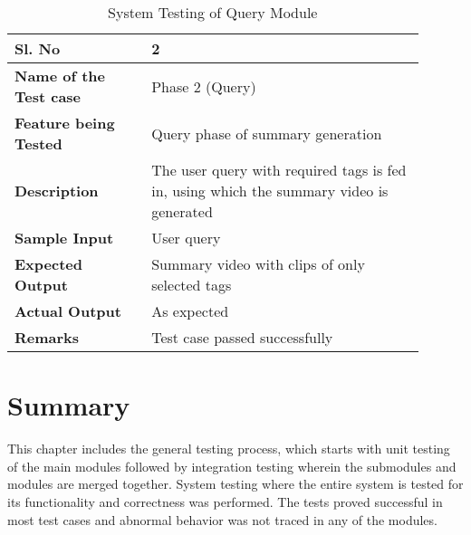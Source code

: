     \FloatBarrier
    \begin{table}[H]
        \begin{tabular}{|p{0.3\linewidth}|p{0.6\linewidth}|}
            \hline
            \textbf{Sl. No }              &\textbf{ 2}\\
            \hline
            \textbf{Name of the Test case}  & Phase 2 (Query) \\
            \hline
            \textbf{Feature being Tested}  & Query phase of summary generation \\
            \hline
            \textbf{Description}           & The user query with required tags is fed in, using which the summary video is generated \\
            \hline
            \textbf{Sample Input}          & User query \\
            \hline
            \textbf{Expected Output}       & Summary video with clips of only selected tags \\
            \hline
            \textbf{Actual Output}         & As expected \\
            \hline
            \textbf{Remarks }              & Test case passed successfully \\
            \hline
        \end{tabular}
        \caption{System Testing of Query Module}
        \label{table:system-query}
    \end{table}

\section{Summary}

This chapter includes the general testing process, which starts with unit testing of the main modules followed by integration testing wherein the submodules and modules are merged together. System testing where the entire system is tested for its functionality and correctness was performed. The tests proved successful in most test cases and abnormal behavior was not traced in any of the modules.